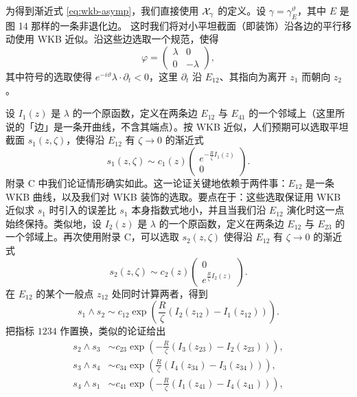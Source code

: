 为得到渐近式 \eqref{eq:wkb-asymp}，我们直接使用 $\mathcal{X}_\gamma$ 的定义。设 $\gamma=\gamma^\vartheta_E$，其中 $E$ 是图 14 那样的一条非退化边。%
这时我们将对小平坦截面（即装饰）沿各边的平行移动使用 WKB 近似。沿这些边选取一个规范，使得
\begin{equation}\label{eq:gauge-diagonal}
\varphi = \begin{pmatrix} \lambda & 0 \\ 0 & -\lambda \end{pmatrix},
\end{equation}
其中符号的选取使得 $e^{-i\vartheta}\lambda\cdot\partial_t<0$，这里 $\partial_t$ 沿 $E_{12}$、其指向为离开 $z_1$ 而朝向 $z_2$。

设 $I_1(z)$ 是 $\lambda$ 的一个原函数，定义在两条边 $E_{12}$ 与 $E_{41}$ 的一个邻域上（这里所说的「边」是一条开曲线，不含其端点）。按 WKB 近似，人们预期可以选取平坦截面 $s_1(z,\zeta)$，使得沿 $E_{12}$ 有 $\zeta\to0$ 的渐近式
\begin{equation}\label{eq:s1-asymp}
s_1(z, \zeta) \sim c_1(z) \begin{pmatrix} e^{- \frac{R}{\zeta} I_{1}(z)} \\ 0 \end{pmatrix}.
\end{equation}
附录 C%
中我们论证情形确实如此。这一论证关键地依赖于两件事：$E_{12}$ 是一条 WKB 曲线，以及我们对 WKB 装饰的选取。要点在于：这些选取保证用 WKB 近似求 $s_1$ 时引入的误差比 $s_1$ 本身指数式地小，并且当我们沿 $E_{12}$ 演化时这一点始终保持。类似地，设 $I_2(z)$ 是 $\lambda$ 的一个原函数，定义在两条边 $E_{12}$ 与 $E_{23}$ 的一个邻域上。再次使用附录 C，可以选取 $s_2(z,\zeta)$ 使得沿 $E_{12}$ 有 $\zeta\to0$ 的渐近式
\begin{equation}\label{eq:s2-asymp}
s_2(z, \zeta) \sim c_2(z) \begin{pmatrix} 0 \\ e^{\frac{R}{\zeta} I_2(z)} \end{pmatrix}.
\end{equation}
在 $E_{12}$ 的某个一般点 $z_{12}$ 处同时计算两者，得到
\begin{equation}\label{eq:wedge-12}
s_1 \wedge s_2 \sim c_{12} \exp \left( \frac{R}{\zeta} (I_2(z_{12}) - I_1(z_{12})) \right).
\end{equation}
把指标 $1234$ 作置换，类似的论证给出
\begin{align}
s_2 \wedge s_3 &\sim c_{23} \exp \left( -\frac{R}{\zeta} (I_3(z_{23}) - I_2(z_{23})) \right), \label{eq:wedge-23}\\
s_3 \wedge s_4 &\sim c_{34} \exp \left( \frac{R}{\zeta} (I_4(z_{34}) - I_3(z_{34})) \right), \label{eq:wedge-34}\\
s_4 \wedge s_1 &\sim c_{41} \exp \left( -\frac{R}{\zeta} (I_1(z_{41}) - I_4(z_{41})) \right), \label{eq:wedge-41}
\end{align}
